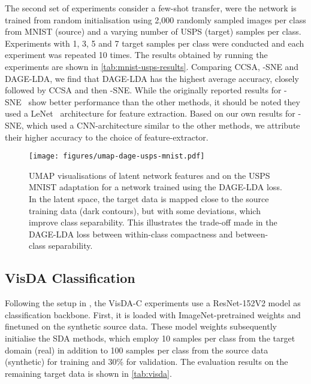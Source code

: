 \documentclass[journal]{IEEEtran}
\begin{document}
The second set of experiments consider a few-shot transfer, were the network is trained from random initialisation using 2,000 randomly sampled images per class from MNIST (source) and a varying number of USPS (target) samples per class. Experiments with 1, 3, 5 and 7 target samples per class were conducted and each experiment was repeated 10 times.
The results obtained by running the experiments are shown in \cref{tab:mnist-usps-results}. Comparing CCSA, -SNE and DAGE-LDA, we find that DAGE-LDA has the highest average accuracy, closely followed by CCSA and then -SNE. 
While the originally reported results for -SNE~\cite{xu2019dsne} show better performance than the other methods, it should be noted they used a LeNet~\cite{wen2016conv} architecture for feature extraction. Based on our own results for -SNE, which used a CNN-architecture similar to the other methods, we attribute their higher accuracy to the choice of feature-extractor.


\begin{figure}
    \centering
    \texttt{[image: figures/umap-dage-usps-mnist.pdf]}
    \caption{
        UMAP visualisations of latent network features  and  on the USPS  MNIST adaptation for a network trained using the DAGE-LDA loss.
        In the latent space, the target data is mapped close to the source training data (dark contours), but with some deviations, which improve class separability. This illustrates the trade-off made in the DAGE-LDA loss between within-class compactness and between-class separability.
    }
    \label{fig:dage-features}
\end{figure}


\subsection{VisDA Classification}

Following the setup in \cite{xu2019dsne}, the VisDA-C experiments use a ResNet-152V2 model as classification backbone. First, it is loaded with ImageNet-pretrained weights and finetuned on the synthetic source data. These model weights subsequently initialise the SDA methods, which employ 10 samples per class from the target domain (real) in addition to 100 samples per class from the source data (synthetic) for training and 30\% for validation. The evaluation results on the remaining target data is shown in \cref{tab:visda}.
\end{document}
